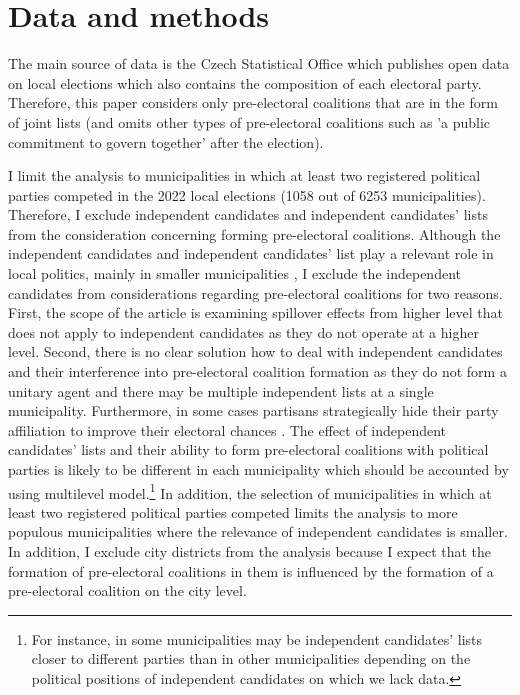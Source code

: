 \documentclass[]{interact}
\theoremstyle{plain}%
\theoremstyle{definition}
\theoremstyle{remark}
\begin{document}
\section{Data and methods}

The main source of data is the Czech Statistical Office which publishes open data on local elections which also contains the composition of each electoral party. Therefore, this paper considers only pre-electoral coalitions that are in the form of joint lists (and omits other types of pre-electoral coalitions such as 'a public commitment to govern together' after the election). 

I limit the analysis to municipalities in which at least two registered political parties competed in the 2022 local elections (1058 out of 6253 municipalities). Therefore, I exclude independent candidates and independent candidates' lists from the consideration concerning forming pre-electoral coalitions. Although the independent candidates and independent candidates' list play a relevant role in local politics, mainly in smaller municipalities \citep{kostelecky2023}, I exclude the independent candidates from considerations regarding pre-electoral coalitions for two reasons. First, the scope of the article is examining spillover effects from higher level that does not apply to independent candidates as they do not operate at a higher level. Second, there is no clear solution how to deal with independent candidates and their interference into pre-electoral coalition formation as they do not form a unitary agent and there may be multiple independent lists at a single municipality. Furthermore, in some cases partisans strategically hide their party affiliation to improve their electoral chances \citep[503]{kostelecky2023,gendzwill2012}. The effect of independent candidates' lists and their ability to form pre-electoral coalitions with political parties is likely to be different in each municipality which should be accounted by using multilevel model.\footnote{For instance, in some municipalities may be independent candidates' lists closer to different parties than in other municipalities depending on the political positions of independent candidates on which we lack data.} 
In addition, the selection of municipalities in which at least two registered political parties competed limits the analysis to more populous municipalities where the relevance of independent candidates is smaller. In addition, I exclude city districts from the analysis because I expect that the formation of pre-electoral coalitions in them is influenced by the formation of a pre-electoral coalition on the city level. 
\end{document}
